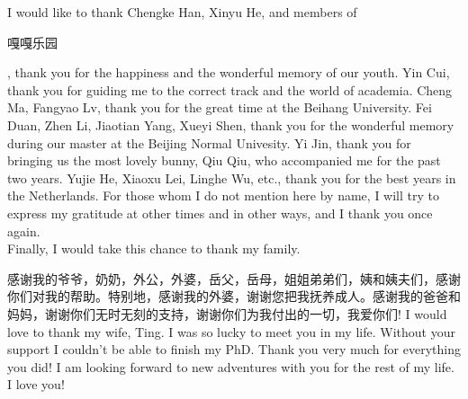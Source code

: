 \noindent
I would like to thank Chengke Han, Xinyu He, and members of \begin{CJK*}{UTF8}{gbsn}
嘎嘎乐园\end{CJK*}, thank you for the happiness and the wonderful memory of our youth. Yin Cui, thank you for guiding me to the correct track and the world of academia. Cheng Ma, Fangyao Lv, thank you for the great time at the Beihang University. Fei Duan, Zhen Li, Jiaotian Yang, Xueyi Shen, thank you for the wonderful memory during our master at the Beijing Normal Univesity. Yi Jin, thank you for bringing us the most lovely bunny, Qiu Qiu, who accompanied me for the past two years. Yujie He, Xiaoxu Lei, Linghe Wu, etc., thank you for the best years in the Netherlands. For those whom I do not mention here by name, I will try to express my gratitude at other times and in other ways, and I thank you once again.\\

\noindent
Finally, I would take this chance to thank my family. 
\begin{CJK*}{UTF8}{gbsn}
感谢我的爷爷，奶奶，外公，外婆，岳父，岳母，姐姐弟弟们，姨和姨夫们，感谢你们对我的帮助。特别地，感谢我的外婆，谢谢您把我抚养成人。感谢我的爸爸和妈妈，谢谢你们无时无刻的支持，谢谢你们为我付出的一切，我爱你们! I would love to thank my wife, Ting. I was so lucky to meet you in my life. Without your support I couldn't be able to finish my PhD. Thank you very much for everything you did! I am looking forward to new adventures with you for the rest of my life. I love you! \end{CJK*} 
